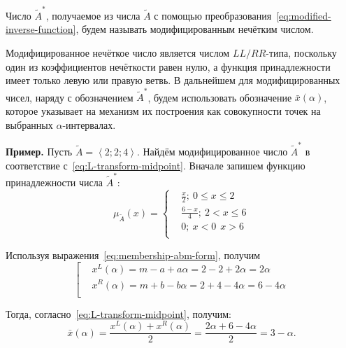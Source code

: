 \begin{mydef}
Число $\tilde A^{*}$, получаемое из числа $\tilde{A}$ с помощью преобразования~\eqref{eq:modified-inverse-function}, будем называть модифицированным нечётким числом.
\end{mydef}
Модифицированное нечёткое число является числом $LL/RR$-типа, поскольку один из коэффициентов нечёткости равен нулю, а функция принадлежности имеет только левую или правую ветвь. В дальнейшем для модифицированных чисел, наряду с обозначением $\tilde A^{*}$, будем использовать обозначение $\bar{x}\left( \alpha  \right)$, которое указывает на механизм их построения как совокупности точек на выбранных $\alpha $-интервалах.

\textbf{Пример.} Пусть $\tilde{A}=\left\langle 2;2;4 \right\rangle $. Найдём модифицированное число $\tilde A^{*}$ в соответствие с~\eqref{eq:L-transform-midpoint}.
Вначале запишем функцию принадлежности числа $\tilde A^{*}$:
\begin{equation*}
	\mu_{\tilde A} \left( x \right)=\left\{ 
	  \begin{aligned}
        & \frac{x}{2};\ 0\le x\le 2 \\ 
        & \frac{6-x}{4};\ 2<x\le 6 \\ 
        & 0;\ x<0\ \ x>6 \\ 
      \end{aligned} \right.
\end{equation*}

Используя выражения~\eqref{eq:membership-abm-form}, получим
\begin{equation*}
	\left[ \begin{aligned}
      & {{x}^{L}}\left( \alpha  \right)=m-a+a\alpha =2-2+2\alpha =2\alpha  \\ 
      & {{x}^{R}}\left( \alpha  \right)=m+b-b\alpha =2+4-4\alpha =6-4\alpha  \\ 
    \end{aligned} \right.
\end{equation*}

Тогда, согласно~\eqref{eq:L-transform-midpoint}, получим:
\begin{equation*}
	\bar{x}\left( \alpha  \right)=\frac{{{x}^{L}}\left( \alpha  \right)+{{x}^{R}}\left( \alpha  \right)}{2}=\frac{2\alpha +6-4\alpha }{2}=3-\alpha.
\end{equation*}

